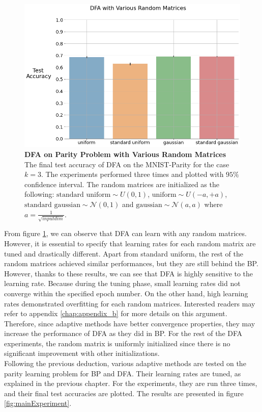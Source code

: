 \documentclass[a4paper, nobind]{templates/ociamthesis}
\begin{document}
\begin{figure}

{\centering \includegraphics[width=1\linewidth]{figures/3_k3_DFA_RandomMatrices} 

}

\caption[DFA on MNIST-Parity Problem with Various Random Matrices]{\textbf{DFA on Parity Problem with Various Random Matrices} \newline The final test accuracy of DFA on the MNIST-Parity for the case $k=3$. The experiments performed three times and plotted with $95\%$ confidence interval. The random matrices are initialized as the following: $\text{standard uniform} \sim U(0,1)$, $\text{uniform} \sim U(-a,+a)$, $\text{standard gaussian} \sim \mathcal{N}\left(0, 1\right)$ and $\text{gaussian} \sim \mathcal{N}\left(a, a \right)$ where $a= \frac{1}{\sqrt{input dim}}$.}\label{fig:DFARandomMatrices}
\end{figure}

\noindent From figure \ref{fig:DFARandomMatrices}, we can observe that DFA can learn with any random matrices. However, it is essential to specify that learning rates for each random matrix are tuned and drastically different. Apart from standard uniform, the rest of the random matrices achieved similar performances, but they are still behind the BP. However, thanks to these results, we can see that DFA is highly sensitive to the learning rate. Because during the tuning phase, small learning rates did not converge within the specified epoch number. On the other hand, high learning rates demonstrated overfitting for each random matrices. Interested readers may refer to appendix \ref{chap:appendix_b} for more details on this argument. Therefore, since adaptive methods have better convergence properties, they may increase the performance of DFA as they did in BP. For the rest of the DFA experiments, the random matrix is uniformly initialized since there is no significant improvement with other initializations.\\
\noindent Following the previous deduction, various adaptive methods are tested on the parity learning problem for BP and DFA. Their learning rates are tuned, as explained in the previous chapter. For the experiments, they are run three times, and their final test accuracies are plotted. The results are presented in figure \ref{fig:mainExperiment}.
\end{document}
